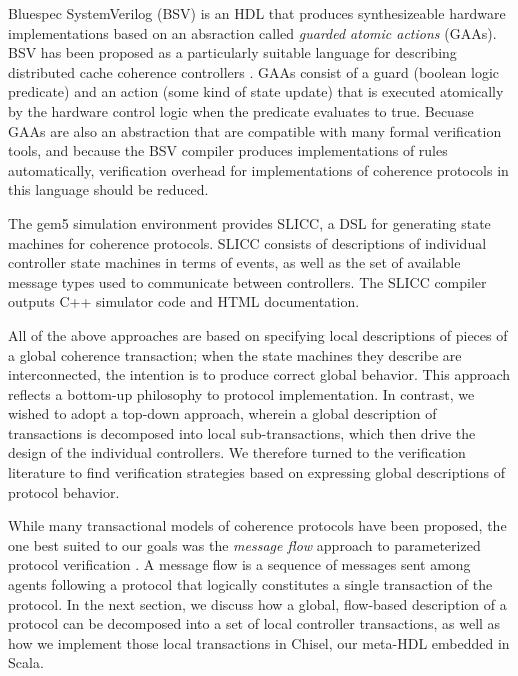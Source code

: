 Bluespec SystemVerilog (BSV) \cite{bluespec}
is an HDL that produces synthesizeable hardware implementations based on an absraction called \emph{guarded atomic actions} (GAAs).
BSV has been proposed as a particularly suitable language for describing distributed cache coherence controllers \cite{dave-memocode05}.
GAAs consist of a guard (boolean logic predicate) and an action (some kind of state update)
that is executed atomically by the hardware control logic when the predicate evaluates to true.
Becuase GAAs are also an abstraction that are compatible with many formal verification tools,
and because the BSV compiler produces implementations of rules automatically,
verification overhead for implementations of coherence protocols in this language should be reduced.

The gem5 simulation environment \cite{binkert-sigarch11}
provides SLICC, a DSL for generating state machines for coherence protocols.
SLICC consists of descriptions of individual controller state machines in terms of events, as well as the set of available message types
used to communicate between controllers.
The SLICC compiler outputs C++ simulator code and HTML documentation.

All of the above approaches are based on specifying local descriptions of pieces of a global coherence transaction;
when the state machines they describe are interconnected, the intention is to produce correct global behavior.
This approach reflects a bottom-up philosophy to protocol implementation.
In contrast, we wished to adopt a top-down approach, wherein a global description of transactions
is decomposed into local sub-transactions, which then drive the design of the individual controllers.
We therefore turned to the verification literature to find verification strategies based on expressing global descriptions of protocol behavior.

While many transactional models of coherence protocols have been proposed,
the one best suited to our goals was the \emph{message flow} approach to parameterized protocol verification
\cite{talupur2008going, oleary-fmcad09}.
A message flow is a sequence of messages sent among agents following a protocol that
logically constitutes a single transaction of the protocol. 
In the next section, we discuss how a global, flow-based description of a protocol can be decomposed into a set
of local controller transactions, as well as how we implement those local transactions in Chisel,
our meta-HDL embedded in Scala.

